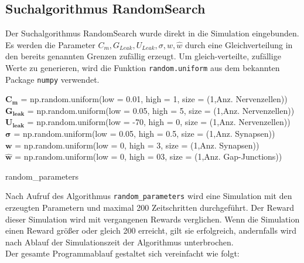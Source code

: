 	\subsection{Suchalgorithmus RandomSearch}
		Der Suchalgorithmus RandomSearch wurde direkt in die Simulation eingebunden. Es werden die Parameter $C_m, G_{Leak}, U_{Leak}, \sigma, w, \hat{w}$ durch eine Gleichverteilung in den bereits genannten Grenzen zufällig erzeugt. Um gleich-verteilte, zufällige Werte zu generieren, wird die Funktion \texttt{random.uniform} aus dem bekannten Package \texttt{numpy} verwendet.
		\begin{algorithm}
			
				$\boldsymbol{C_m}$ = np.random.uniform(low = 0.01, high = 1, size = (1,Anz. Nervenzellen))\\
				$\boldsymbol{G_{leak}}$ = np.random.uniform(low = 0.05, high = 5, size = (1,Anz. Nervenzellen))\\
				$\boldsymbol{U_{leak}}$ = np.random.uniform(low = -70, high = 0, size = (1,Anz. Nervenzellen))\\
				$\boldsymbol{\sigma}$ = np.random.uniform(low = 0.05, high = 0.5, size = (1,Anz. Synapsen))\\
				$\boldsymbol{w}$ = np.random.uniform(low = 0, high = 3, size = (1,Anz. Synapsen))\\
				$\boldsymbol{\hat{w}}$ = np.random.uniform(low = 0, high = 03, size = (1,Anz. Gap-Junctions))
			\caption{random\_parameters}
		\end{algorithm}
		Nach Aufruf des Algorithmus \texttt{random\_parameters} wird eine Simulation mit den erzeugten Parametern und maximal 200 Zeitschritten durchgeführt. Der Reward dieser Simulation wird mit vergangenen Rewards verglichen. Wenn die Simulation einen Reward größer oder gleich 200 erreicht, gilt sie erfolgreich, andernfalls wird nach Ablauf der Simulationszeit der Algorithmus unterbrochen.\\
		Der gesamte Programmablauf gestaltet sich vereinfacht wie folgt:
